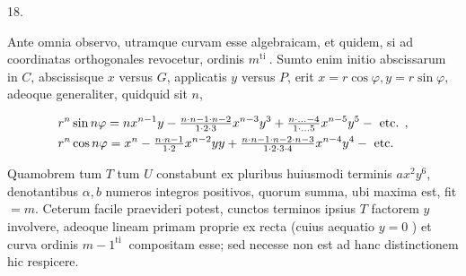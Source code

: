 \documentclass[twoside,12pt, showframe]{memoir}
\let\oldfrac\frac
\def\frac#1#2{\mathchoice{\tfrac{#1}{#2}}{\oldfrac{#1}{#2}}{\genfrac{}{}{}{2}{#1}{#2\mathstrut}}{\genfrac{}{}{}{3}{#1}{#2\mathstrut}}}
\begin{document}
18.

Ante omnia observo, utramque curvam esse algebraicam, et quidem, si ad coordinatas orthogonales revocetur, ordinis \(m^{\text {ti }}\). Sumto enim initio abscissarum in \(C\), abscissisque \(x\) versus \(G\), applicatis \(y\) versus \(P\), erit \(x=r \cos \varphi, y=r \sin \varphi\), adeoque generaliter, quidquid sit \(n\),

\[
\begin{aligned}
& r^{n} \sin n \varphi=n x^{n-1} y-\frac{n \cdot n-1 \cdot n-2}{1 \cdot 2 \cdot 3} x^{n-3} y^{3}+\frac{n \cdot \ldots-4}{1 \cdot \ldots 5} x^{n-5} y^{5}-\text { etc. }, \\
& r^{n} \cos n \varphi=x^{n}-\frac{n \cdot n-1}{1 \cdot 2} x^{n-2} y y+\frac{n \cdot n-1 \cdot n-2 \cdot n-3}{1 \cdot 2 \cdot 3 \cdot 4} x^{n-4} y^{4}-\text { etc. }
\end{aligned}
\]

Quamobrem tum \(T\) tum \(U\) constabunt ex pluribus huiusmodi terminis \(a x^{2} y^{6}\),
denotantibus \(\alpha, b\) numeros integros positivos, quorum summa, ubi maxima est, fit \(=m\). Ceterum facile praevideri potest, cunctos terminos ipsius \(T\) factorem \(y\) involvere, adeoque lineam primam proprie ex recta (cuius aequatio \(y=0\) ) et curva ordinis \(m-1^{\text {ti }}\) compositam esse; sed necesse non est ad hanc distinctionem hic respicere.
\end{document}
